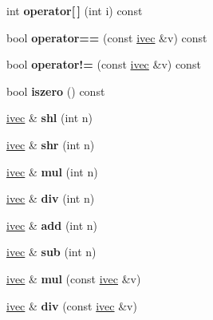 \begin{DoxyCompactItemize}
int {\bfseries operator\mbox{[}$\,$\mbox{]}} (int i) const
\item 
\mbox{\label{structivec_ab336767a57073a6b7803da927bbe7243}} 
bool {\bfseries operator==} (const \hyperlink{structivec}{ivec} \&v) const
\item 
\mbox{\label{structivec_a946e3e50c6c506799f562897d284efe1}} 
bool {\bfseries operator!=} (const \hyperlink{structivec}{ivec} \&v) const
\item 
\mbox{\label{structivec_a17f5d114411f220ab0ea5865d5f5e9a2}} 
bool {\bfseries iszero} () const
\item 
\mbox{\label{structivec_aebfe5a7ed9375dc10a6787f375924cad}} 
\hyperlink{structivec}{ivec} \& {\bfseries shl} (int n)
\item 
\mbox{\label{structivec_aef2ff8b380dc866667fffba850604276}} 
\hyperlink{structivec}{ivec} \& {\bfseries shr} (int n)
\item 
\mbox{\label{structivec_af17735932d2abd4ee361a0ca960a116e}} 
\hyperlink{structivec}{ivec} \& {\bfseries mul} (int n)
\item 
\mbox{\label{structivec_a34374e14054ada4c7314895bd18253b5}} 
\hyperlink{structivec}{ivec} \& {\bfseries div} (int n)
\item 
\mbox{\label{structivec_a6183193b2f7a1854e644f05e8019c58a}} 
\hyperlink{structivec}{ivec} \& {\bfseries add} (int n)
\item 
\mbox{\label{structivec_a4a1f31d9a20025dd72c2dbb9c0f171f7}} 
\hyperlink{structivec}{ivec} \& {\bfseries sub} (int n)
\item 
\mbox{\label{structivec_a156cea2f898961ffe5a1dbc5263215e1}} 
\hyperlink{structivec}{ivec} \& {\bfseries mul} (const \hyperlink{structivec}{ivec} \&v)
\item 
\mbox{\label{structivec_a139b85dbc76d68c636ef5502d8bf1ada}} 
\hyperlink{structivec}{ivec} \& {\bfseries div} (const \hyperlink{structivec}{ivec} \&v)
\item 

\end{DoxyCompactItemize}
